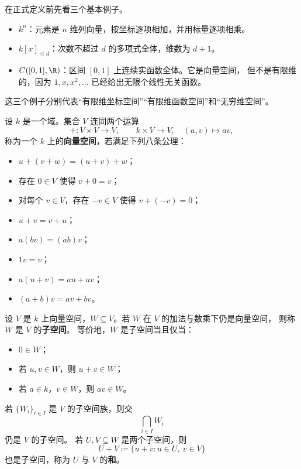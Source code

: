 \begin{example}
在正式定义前先看三个基本例子。
\begin{itemize}
  \item $k^n$：元素是 $n$ 维列向量，按坐标逐项相加，并用标量逐项相乘。
  \item $k[x]_{\le d}$：次数不超过 $d$ 的多项式全体，维数为 $d+1$。
  \item $C([0,1],\R)$：区间 $[0,1]$ 上连续实函数全体。它是向量空间，
  但不是有限维的，因为 $1,x,x^2,\dots$ 已经给出无限个线性无关函数。
\end{itemize}
这三个例子分别代表“有限维坐标空间”“有限维函数空间”和“无穷维空间”。
\end{example}

\begin{definition}[向量空间]
设 $k$ 是一个域。集合 $V$ 连同两个运算
\[
  +\colon V\times V\to V,
  \qquad
  k\times V\to V,
  \quad (a,v)\mapsto av,
\]
称为一个 $k$ 上的\textbf{向量空间}，若满足下列八条公理：
\begin{itemize}
  \item[(1)] $u+(v+w)=(u+v)+w$；
  \item[(2)] 存在 $0\in V$ 使得 $v+0=v$；
  \item[(3)] 对每个 $v\in V$，存在 $-v\in V$ 使得 $v+(-v)=0$；
  \item[(4)] $u+v=v+u$；
  \item[(5)] $a(bv)=(ab)v$；
  \item[(6)] $1v=v$；
  \item[(7)] $a(u+v)=au+av$；
  \item[(8)] $(a+b)v=av+bv$。
\end{itemize}
\end{definition}

\begin{definition}[子空间]
设 $V$ 是 $k$ 上向量空间，$W\subseteq V$。若 $W$ 在 $V$ 的加法与数乘下仍是向量空间，
则称 $W$ 是 $V$ 的\textbf{子空间}。
等价地，$W$ 是子空间当且仅当：
\begin{itemize}
  \item $0\in W$；
  \item 若 $u,v\in W$，则 $u+v\in W$；
  \item 若 $a\in k$，$v\in W$，则 $av\in W$。
\end{itemize}
\end{definition}

\begin{proposition}
若 $\{W_i\}_{i\in I}$ 是 $V$ 的子空间族，则交
\[
  \bigcap_{i\in I} W_i
\]
仍是 $V$ 的子空间。
若 $U,V\subseteq W$ 是两个子空间，则
\[
  U+V\coloneqq \{u+v:u\in U,\ v\in V\}
\]
也是子空间，称为 $U$ 与 $V$ 的\textbf{和}。
\end{proposition}

